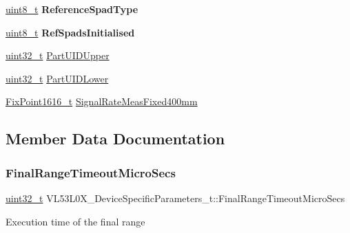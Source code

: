 \begin{DoxyCompactItemize}
\hyperlink{vl53l0x__types_8h_aba7bc1797add20fe3efdf37ced1182c5}{uint8\+\_\+t} {\bfseries Reference\+Spad\+Type}
\item 
\mbox{\label{structVL53L0X__DeviceSpecificParameters__t_ac8d6fe160f19e8a841260a701a9712ed}} 
\hyperlink{vl53l0x__types_8h_aba7bc1797add20fe3efdf37ced1182c5}{uint8\+\_\+t} {\bfseries Ref\+Spads\+Initialised}
\item 
\hyperlink{vl53l0x__types_8h_a435d1572bf3f880d55459d9805097f62}{uint32\+\_\+t} \hyperlink{structVL53L0X__DeviceSpecificParameters__t_ae2e322fd56131a4c8f85b5fd9095d609}{Part\+U\+I\+D\+Upper}
\item 
\hyperlink{vl53l0x__types_8h_a435d1572bf3f880d55459d9805097f62}{uint32\+\_\+t} \hyperlink{structVL53L0X__DeviceSpecificParameters__t_a4d5cf527506898d5373023be984bd7e9}{Part\+U\+I\+D\+Lower}
\item 
\hyperlink{vl53l0x__types_8h_afb910790161809fc76e1a274a6349384}{Fix\+Point1616\+\_\+t} \hyperlink{structVL53L0X__DeviceSpecificParameters__t_a9564eca4dc836cb36a4f6ad12941bc6c}{Signal\+Rate\+Meas\+Fixed400mm}
\end{DoxyCompactItemize}


\subsection{Member Data Documentation}
\mbox{\label{structVL53L0X__DeviceSpecificParameters__t_a49b96750aa9ee22517caeb4a6a4e427c}} 
\subsubsection{\texorpdfstring{Final\+Range\+Timeout\+Micro\+Secs}{FinalRangeTimeoutMicroSecs}}
{\footnotesize\ttfamily \hyperlink{vl53l0x__types_8h_a435d1572bf3f880d55459d9805097f62}{uint32\+\_\+t} V\+L53\+L0\+X\+\_\+\+Device\+Specific\+Parameters\+\_\+t\+::\+Final\+Range\+Timeout\+Micro\+Secs}

Execution time of the final range \mbox{\label{structVL53L0X__DeviceSpecificParameters__t_a8d9221ba4a2fa8e41ee5fa4cd508775a}} 
